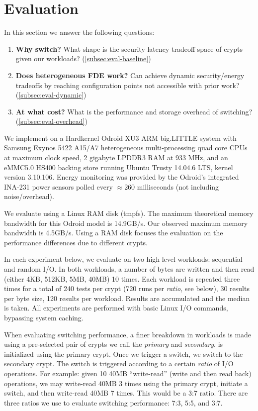 \section{Evaluation}\label{sec:eval}

In this section we answer the following questions:

\begin{enumerate}
 \item {\bf Why switch?} What shape is the security-latency tradeoff space of
 crypts given our workloads? (\cref{subsec:eval-baseline})
 \item {\bf Does heterogeneous FDE work?} Can \sys achieve dynamic
 security/energy tradeoffs by reaching configuration points not accessible with
 prior work? (\cref{subsec:eval-dynamic})
 \item {\bf At what cost?} What is the performance and storage overhead of
 switching? (\cref{subsec:eval-overhead})
\end{enumerate}

 We implement \sys on a Hardkernel Odroid XU3 ARM
big.LITTLE system with Samsung Exynos 5422 A15/A7 heterogeneous multi-processing
quad core CPUs at maximum clock speed, 2 gigabyte LPDDR3 RAM at 933 MHz, and an
eMMC5.0 HS400 backing store running Ubuntu Trusty 14.04.6 LTS, kernel version
3.10.106. Energy monitoring was provided by the Odroid's integrated INA-231
power sensors polled every $\approx{260}$ milliseconds (not including
noise/overhead).

We evaluate \sys using a Linux RAM disk (tmpfs). The maximum theoretical memory
bandwidth for this Odroid model is 14.9GB/s\@. Our observed maximum memory
bandwidth is 4.5GB/s. Using a RAM disk focuses the evaluation on the performance
differences due to different crypts.

 In each experiment below, we evaluate \sys on two high
level workloads: sequential and random I/O. In both workloads, a number of bytes
are written and then read (either 4KB, 512KB, 5MB, 40MB) 10 times. Each workload
is repeated three times for a total of 240 tests per crypt (720 runs per {\em
ratio}, see below), 30 results per byte size, 120 results per workload. Results
are accumulated and the median is taken. All experiments are performed with
basic Linux I/O commands, bypassing system caching.

When evaluating switching performance, a finer breakdown in workloads is made
using a pre-selected pair of crypts we call the {\em primary} and {\em
secondary}. \sys is initialized using the primary crypt. Once we trigger a
switch, we switch to the secondary crypt. The switch is triggered according to a
certain {\em ratio} of I/O operations. For example: given 10 40MB ``write-read''
(write and then read back) operations, we may write-read 40MB 3 times using the
primary crypt, initiate a switch, and then write-read 40MB 7 times. This would
be a 3:7 ratio. There are three ratios we use to evaluate switching performance:
7:3, 5:5, and 3:7.


